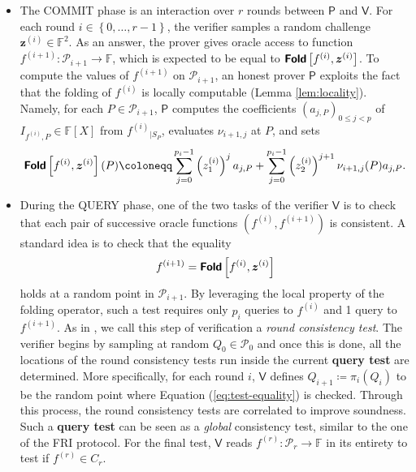 \documentclass[10pt,a4paper]{article}
\newcommand\F{\mathbb{F}}
\newcommand\fold[1]{\textsf{\textbf{Fold}}\left[#1\right]}
\def\rest#1#2{{{#1}_{|#2}}}
\newcommand\prover{\mathsf{P}}
\newcommand\verifier{\mathsf{V}}
\renewcommand{\vec}[1]{\boldsymbol{#1}}
\newcommand{\set}[1]{\left\{#1\right\}}
\newcommand{\range}[1]{\set{0,\dots,#1-1}}
\newcommand\bfz{{\vec{z}}}
\newcommand\calP{\mathcal{P}}
\newcommand\mydef{\coloneqq}
\theoremstyle{plain}
\theoremstyle{plain}
\theoremstyle{definition}
\theoremstyle{remark}
\theoremstyle{plain}
\begin{document}
\begin{itemize}
	\item The \textsf{COMMIT} phase 
	is an interaction over $r$ rounds between $\prover$ and $\verifier$. For each round $i \in \range{r}$, the verifier samples a random challenge $\bfz^{(i)} \in \F^2$. As an answer, the prover gives oracle access to function $f^{(i+1)} : \calP_{i+1} \rightarrow \F$, which is expected to be equal to $\fold{f^{(i)}, \bfz^{(i)}}$. To compute the values of $f^{(i+1)}$ on $\calP_{i+1}$, an honest prover $\prover$ exploits the fact that the folding of $f^{(i)}$ is locally computable (Lemma \ref{lem:locality}). Namely, for each $P \in \calP_{i+1}$, $\prover$ computes the coefficients $(a_{j,P})_{0 \le j < p}$ of  $I_{f^{(i)}, P} \in \F[X]$ from $\rest{f^{(i)}}{S_P}$, evaluates $\nu_{i+1,j}$ at $P$, and sets 
	\[
	\fold{f^{(i)}, \bfz^{(i)}}(P) \mydef\sum_{j=0}^{p_i-1} \left(z_1^{(i)}\right)^j a_{j, P} + \sum_{j=0}^{p_i-1} \left(z_2^{(i)}\right)^{j+1} \nu_{i+1,j}(P) a_{j, P}.
	\] 
	\item During the \textsf{QUERY} phase, one of the two tasks of the verifier $\verifier$ is to check that each pair of successive oracle functions $(f^{(i)}, f^{(i+1)})$ is consistent. A standard idea is to check that the equality 
	\begin{equation}\label{eq:test-equality}
		f^{(i+1)} = \fold{f^{(i)}, \bfz^{(i)}}
	\end{equation}
	holds at a random point in $\calP_{i+ 1}$.
	By leveraging the local property of the folding operator, such a test requires only $p_i$ queries to $f^{(i)}$ and 1 query to $f^{(i + 1)}$. As in \cite{BBHR18a}, we call this step of verification a \emph{round consistency test}. The verifier begins by sampling at random $Q_0 \in \calP_0$ and once this is done, all the locations of the round consistency tests run inside the current \textsf{\textbf{query test}} are determined. More specifically, for each round $i$,  $\verifier$ defines $Q_{i+1} \mydef \pi_i(Q_i)$ to be the random point where Equation (\ref{eq:test-equality}) is checked. Through this process, the round consistency tests are correlated to improve soundness. Such a \textsf{\textbf{query test}} can be seen as a \emph{global} consistency test, similar to the one of the \textsf{FRI} protocol. For the final test, $\verifier$ reads $f^{(r)} : \calP_r \rightarrow \F$ in its entirety to test if $f^{(r)} \in C_r$.
\end{itemize}
\end{document}
